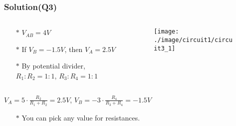 \documentclass{beamer}
\begin{document}

\begin{frame}
\frametitle{Solution(Q3)}

\begin{columns}
\begin{column}{6cm}
\begin{itemize} \itemsep1pt \parskip0pt 
  \item[$\ast$] $V_{AB} = 4V$
  \item[$\ast$] If $V_B = -1.5V$, \newline then $V_A = 2.5V$

  \item[$\ast$] By potential divider, $R_1:R_2 = 1:1$, $R_3:R_4 = 1:1$
\end{itemize}
\end{column}

\begin{column}{6cm}
\begin{figure}[H]
  \label{epi_circuit3_1}
  \centering
  \texttt{[image: ./image/circuit1/circuit3\_1]}
\end{figure}
\end{column}
\end{columns}
\hspace{6mm} $V_A = 5\cdot \frac{R_2}{R_1+R_2}=2.5V$, $V_B = -3\cdot \frac{R_4}{R_3+R_4}=-1.5V$
\begin{itemize} \itemsep1pt \parskip0pt 
  \item[$\ast$] You can pick any value for resistances.
\end{itemize}
\end{frame}

\end{document}
